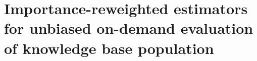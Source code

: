 \chapter[Importance-reweighted estimation]{\label{chap:kbpo} Importance-reweighted estimators for unbiased on-demand evaluation of knowledge base population}













%
%

%
%
